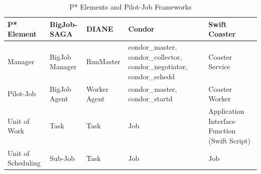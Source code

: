 \documentclass[conference,final]{IEEEtran}
\begin{document}



\begin{table}[t]
\centering
\begin{tabular}{|p{2.5cm}|p{3cm}|p{3cm}|p{3cm}|p{3cm}|}
\hline
\textbf{P* Element} &\textbf{BigJob-SAGA} &\textbf{DIANE} &\textbf{Condor} 
&\textbf{Swift Coaster}  \\
\hline
Manager &BigJob Manager & RunMaster & condor\_master, condor\_collector, condor\_negotiator, condor\_schedd &Coaster Service\\ 
\hline
Pilot-Job &BigJob Agent  & Worker Agent &condor\_master, condor\_startd &Coaster Worker\\
\hline
Unit of Work &Task &Task &Job &Application Interface Function (Swift Script)\\
\hline
Unit of Scheduling &Sub-Job &Task &Job &Job\\
\hline
\end{tabular}
\caption{P* Elements and Pilot-Job Frameworks} \label{table:bigjob-saga-diane}
\end{table}
\end{document}
